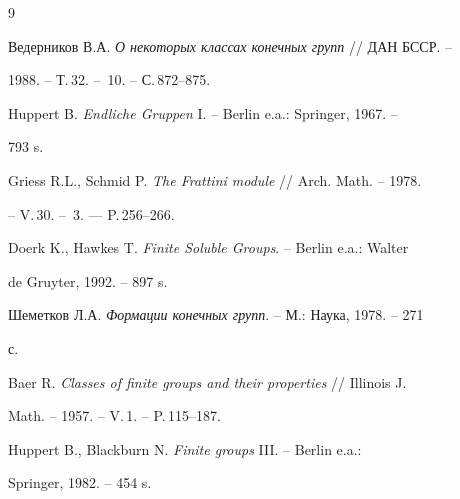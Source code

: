 \begin{thebibliography}{9}







Ведерников В.А. {\em О некоторых классах конечных групп} // ДАН БССР. --


1988. -- Т.\,32. -- \No\,10. -- С.\,872--875.




Huppert B. {\em Endliche Gruppen} I. -- Berlin e.a.: Springer, 1967. --


793 s.




Griess R.L., Schmid P. {\em The Frattini module} // Arch. Math. -- 1978.


-- V.\,30. -- \No\,3. --- P.\,256--266.




Doerk K., Hawkes T. {\em Finite Soluble Groups}. -- Berlin e.a.: Walter


de Gruyter, 1992. -- 897 s.




Шеметков Л.А. {\em Формации конечных групп}. -- М.: Наука, 1978. -- 271


с.




Baer R. {\em Classes of finite groups and their properties} // Illinois J.


Math. -- 1957. -- V.\,1. -- P.\,115--187.




Huppert B., Blackburn N. {\em Finite groups} III. -- Berlin e.a.:


Springer, 1982. -- 454 s.








\end{thebibliography}





\vskip 2cm















